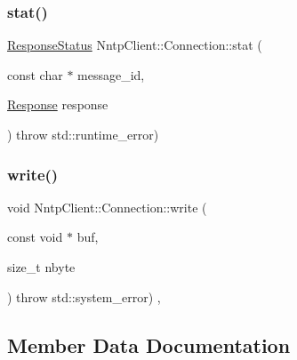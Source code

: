 \hypertarget{class_nntp_client_1_1_connection_a059b80b6d2986a76704792cccf1e2f9a}{}\label{class_nntp_client_1_1_connection_a059b80b6d2986a76704792cccf1e2f9a} 
\subsubsection{\texorpdfstring{stat()}{stat()}}
{\footnotesize\ttfamily \hyperlink{namespace_nntp_client_a920c73a4038b2a2c307245b909b43203}{Response\+Status} Nntp\+Client\+::\+Connection\+::stat (\begin{DoxyParamCaption}\item[{const char $\ast$}]{message\+\_\+id,  }\item[{\hyperlink{class_nntp_client_1_1_response}{Response}}]{response }\end{DoxyParamCaption}) throw  std\+::runtime\+\_\+error) }

\hypertarget{class_nntp_client_1_1_connection_aed3a92b2dd40fa1855c2d71df424f217}{}\label{class_nntp_client_1_1_connection_aed3a92b2dd40fa1855c2d71df424f217} 
\subsubsection{\texorpdfstring{write()}{write()}}
{\footnotesize\ttfamily void Nntp\+Client\+::\+Connection\+::write (\begin{DoxyParamCaption}\item[{const void $\ast$}]{buf,  }\item[{size\+\_\+t}]{nbyte }\end{DoxyParamCaption}) throw  std\+::system\+\_\+error) \hspace{0.3cm}{\ttfamily [protected]}, {\ttfamily [virtual]}}



\subsection{Member Data Documentation}
\hypertarget{class_nntp_client_1_1_connection_ac976a7e92125e6c8751a06faf1a323b6}{}\label{class_nntp_client_1_1_connection_ac976a7e92125e6c8751a06faf1a323b6} 
